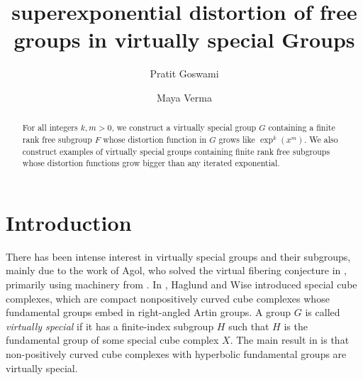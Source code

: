 \documentclass[oneside,11pt,reqno]{amsart}
\theoremstyle{definition}
\begin{document}
\title[superexponential distortion of free groups in virtually special Groups] {superexponential distortion of free groups in virtually special Groups}

\begin{abstract}
For all integers $k, m > 0$, we construct a virtually special group $G$ containing a finite rank free subgroup $F$ whose distortion function in $G$ grows like $\exp^k(x^m)$. We also construct examples of virtually special groups containing finite rank free subgroups whose distortion functions grow bigger than any iterated exponential. %
\end{abstract} 

\author{Pratit Goswami}
\address{University of Oklahoma, Norman, OK 73019-3103, USA}

\author{Maya Verma}
\address{University of Oklahoma, Norman, OK 73019-3103, USA}

\maketitle

\section{Introduction}


There has been intense interest in virtually special groups and their subgroups, mainly due to the work of Agol, who solved the virtual fibering conjecture in \cite{Agol}, primarily using machinery from \cite{spcl}. In \cite{spcl}, Haglund and Wise introduced special cube complexes, which are compact nonpositively curved cube complexes whose fundamental groups embed in right-angled Artin groups. A group $G$ is called \emph{virtually special} if it has a finite-index subgroup $H$ such that $H$ is the fundamental group of some special cube complex $X$. The main result in \cite{Agol} is that non-positively curved cube complexes with hyperbolic fundamental groups are virtually special.
\end{document}

